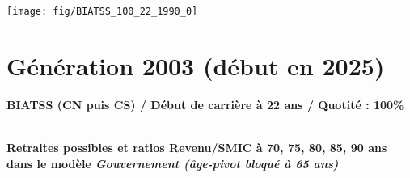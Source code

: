  \vspace{0.1cm} 

 {\hspace{-2.2cm}\texttt{[image: fig/BIATSS\_100\_22\_1990\_0]}} 

\newpage 
 
\section{Génération 2003 (début en 2025)\label{BIATSS_100_22_2003_0}} 
 
{\bf \noindent BIATSS (CN puis CS) / Début de carrière à 22 ans / Quotité : 100\%}  ~ 

 ~\\{\bf \noindent Retraites possibles et ratios Revenu/SMIC à 70, 75, 80, 85, 90 ans dans le modèle \emph{Gouvernement (âge-pivot bloqué à 65 ans)}}  
 
